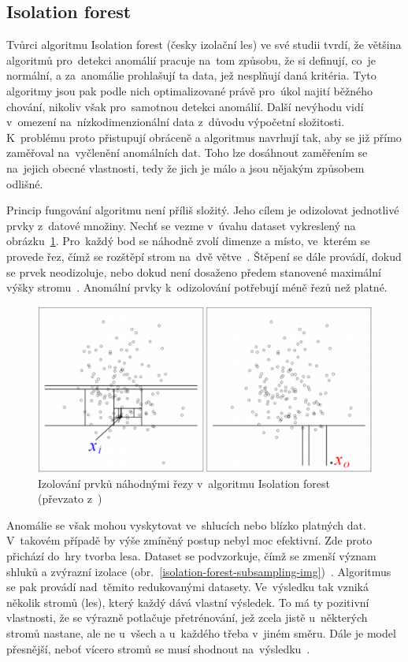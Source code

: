 \subsection{Isolation forest}
\label{isolation-forest}
Tvůrci algoritmu Isolation forest (česky izolační les) ve své studii \cite{isolation-forest} tvrdí, že většina algoritmů pro~detekci anomálií pracuje na~tom způsobu, že si definují, co~je normální, a za~anomálie prohlašují ta data, jež nesplňují daná kritéria. Tyto algoritmy jsou pak podle nich optimalizované právě pro~úkol najití běžného chování, nikoliv však pro~samotnou detekci anomálií. Další nevýhodu vidí v~omezení na~nízkodimenzionální data z~důvodu výpočetní složitosti.
K~problému proto přistupují obráceně a algoritmus navrhují tak, aby se již přímo zaměřoval na~vyčlenění anomálních dat. Toho lze dosáhnout zaměřením se na~jejich obecné vlastnosti, tedy že jich je málo a jsou nějakým způsobem odlišné.

Princip fungování algoritmu není příliš složitý. Jeho cílem je odizolovat jednotlivé prvky z~datové množiny. Nechť se vezme v~úvahu dataset vykreslený na obrázku~\ref{isolation-forest-splitting-img}. Pro~každý bod se náhodně zvolí dimenze a místo, ve~kterém se provede řez, čímž se rozštěpí strom na~dvě větve~\cite{isolation-forest}. Štěpení se dále provádí, dokud se prvek neodizoluje, nebo dokud není dosaženo předem stanovené maximální výšky stromu~\cite{isolation-forest}. Anomální prvky k~odizolování potřebují méně řezů než platné.

\begin{figure}[hbt]
	\centering
	\includegraphics[width=1\textwidth]{obrazky/isolation-forest-splitting.pdf}
	\caption{Izolování prvků náhodnými řezy v~algoritmu Isolation forest (převzato z~\cite{isolation-forest})}
	\label{isolation-forest-splitting-img}
\end{figure}

Anomálie se však mohou vyskytovat ve~shlucích nebo blízko platných dat. V~takovém případě by výše zmíněný postup nebyl moc efektivní. Zde proto přichází do~hry tvorba lesa. Dataset se podvzorkuje, čímž se zmenší význam shluků a zvýrazní izolace (obr.~\ref{isolation-forest-subsampling-img})~\cite{isolation-forest}. Algoritmus se pak provádí nad~těmito redukovanými datasety. Ve~výsledku tak vzniká několik stromů (les), který každý dává vlastní výsledek. To má ty pozitivní vlastnosti, že se výrazně potlačuje přetrénování, jež zcela jistě u~některých stromů nastane, ale ne u~všech a u~každého třeba v~jiném směru. Dále je model přesnější, neboť vícero stromů se musí shodnout na~výsledku~\cite{isolation-forest}.

